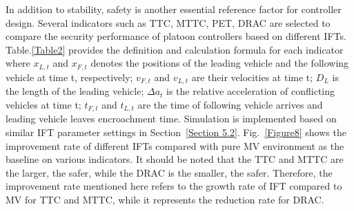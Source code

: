 \documentclass[journal]{IEEEtran}
\begin{document}
In addition to stability, safety is another essential reference factor for controller design. Several indicators such as TTC, MTTC, PET, DRAC are selected to compare the security performance of platoon controllers based on different IFTs. Table.\ref{Table2} provides the definition and calculation formula for each indicator where $x_{L,t}$ and $x_{F,t}$ denotes the positions of the leading vehicle and the following vehicle at time t, respectively; $v_{F,t}$ and $v_{L,t}$ are their velocities at time t; $D_L$ is the length of the leading vehicle; $\Delta a_t$ is the relative acceleration of conflicting vehicles at time t; $t_{F,t}$ and $t_{L,t}$ are the time of following vehicle arrives and leading vehicle leaves encroachment time. Simulation is implemented based on similar IFT parameter settings in Section~\ref{Section 5.2}. Fig.~\ref{Figure8} shows the improvement rate of different IFTs compared with pure MV environment as the baseline on various indicators. It should be noted that the TTC and MTTC are the larger, the safer, while the DRAC is the smaller, the safer. Therefore, the improvement rate mentioned here refers to the growth rate of IFT compared to MV for TTC and MTTC, while it represents the reduction rate for DRAC.
\begin{table}\large
    \centering
    \setlength{\abovecaptionskip}{0pt}
    \setlength{\belowcaptionskip}{10pt}%
    \caption{~Definitions and formulas of indicators used to evaluate safety.}
\label{Table2}
\end{table}
\end{document}

